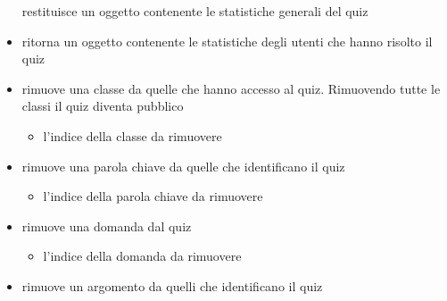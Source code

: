 \begin{itemize}
\newline
restituisce un oggetto contenente le statistiche generali del quiz
\newline
\item {}
\newline
ritorna un oggetto contenente le statistiche degli utenti che hanno risolto il quiz
\newline
\item {}
\newline
rimuove una classe da quelle che hanno accesso al quiz. Rimuovendo tutte le classi il quiz diventa pubblico
\newline
{}
\newline
\begin{itemize}
\item {}
\newline
l'indice della classe da rimuovere
\end{itemize}
\item {}
\newline
rimuove una parola chiave da quelle che identificano il quiz
\newline
{}
\newline
\begin{itemize}
\item {}
\newline
l'indice della parola chiave da rimuovere
\end{itemize}
\item {}
\newline
rimuove una domanda dal quiz
\newline
{}
\newline
\begin{itemize}
\item {}
\newline
l'indice della domanda da rimuovere
\end{itemize}
\item {}
\newline
rimuove un argomento da quelli che identificano il quiz
\newline
{}
\newline
\begin{itemize}

\end{itemize}
\end{itemize}
